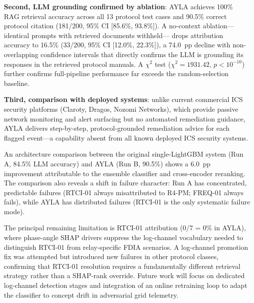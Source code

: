\documentclass[twocolumn, 10pt, letterpaper]{article}
\begin{document}
\textbf{Second, LLM grounding confirmed by ablation}: AYLA achieves 100\%
RAG retrieval accuracy across all 13 protocol test cases and 90.5\% correct
protocol citation (181/200, 95\% CI [85.6\%, 93.8\%]).
A no-context ablation---identical prompts with retrieved documents withheld---
drops attribution accuracy to 16.5\% (33/200, 95\% CI [12.0\%, 22.3\%]),
a 74.0~pp decline with non-overlapping confidence intervals that directly
confirms the LLM is grounding its responses in the retrieved protocol manuals.
A $\chi^2$ test ($\chi^2 = 1931.42$, $p < 10^{-10}$) further confirms
full-pipeline performance far exceeds the random-selection baseline.

\textbf{Third, comparison with deployed systems}: unlike current commercial ICS
security platforms (Claroty, Dragos, Nozomi Networks), which provide passive
network monitoring and alert surfacing but no automated remediation guidance,
AYLA delivers step-by-step, protocol-grounded remediation advice for each
flagged event---a capability absent from all known deployed ICS security systems.

An architecture comparison between the original single-LightGBM system (Run A,
84.5\% LLM accuracy) and AYLA (Run B, 90.5\%) shows a 6.0~pp improvement
attributable to the ensemble classifier and cross-encoder reranking.
The comparison also reveals a shift in failure character: Run A has concentrated,
predictable failures (RTCI-01 always misattributed to R4-PM; FREQ-01 always
fails), while AYLA has distributed failures (RTCI-01 is the only systematic
failure mode).

The principal remaining limitation is RTCI-01 attribution (0/7 = 0\% in AYLA),
where phase-angle SHAP drivers suppress the log-channel vocabulary needed to
distinguish RTCI-01 from relay-specific FDIA scenarios.
A log-channel promotion fix was attempted but introduced new failures in other
protocol classes, confirming that RTCI-01 resolution requires a fundamentally
different retrieval strategy rather than a SHAP-rank override.
Future work will focus on dedicated log-channel detection stages and integration
of an online retraining loop to adapt the classifier to concept drift in
adversarial grid telemetry.



\end{document}
